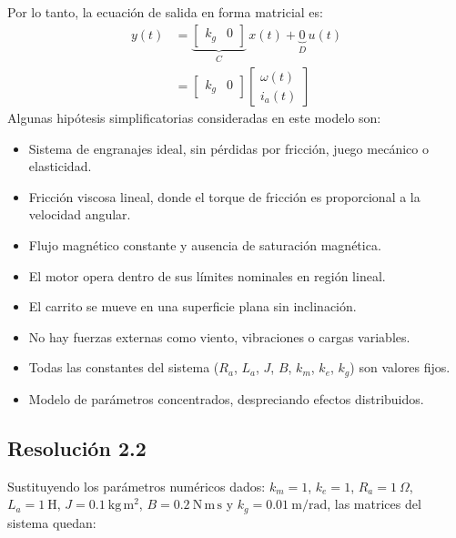 \documentclass[
  11pt,
  letterpaper,
   addpoints,
  answers
  ]{exam}
\begin{document}
\begin{solution}
Por lo tanto, la ecuación de salida en forma matricial es:
\begin{align}
  y(t) &= \underbrace{\begin{bmatrix}k_g & 0\end{bmatrix}}_{C}\,x(t) + \underbrace{0}_{D}\,u(t) \\
  &= \begin{bmatrix} k_g & 0 \end{bmatrix} \begin{bmatrix} \omega(t)\\ i_a(t) \end{bmatrix}
\end{align}
Algunas hipótesis simplificatorias consideradas en este modelo son:
\begin{itemize}
  \item Sistema de engranajes ideal, sin pérdidas por fricción, juego mecánico o elasticidad.
  \item Fricción viscosa lineal, donde el torque de fricción es proporcional a la velocidad angular.
  \item Flujo magnético constante y ausencia de saturación magnética.
  \item El motor opera dentro de sus límites nominales en región lineal.
  \item El carrito se mueve en una superficie plana sin inclinación.
  \item No hay fuerzas externas como viento, vibraciones o cargas variables.
  \item Todas las constantes del sistema ($R_a$, $L_a$, $J$, $B$, $k_m$, $k_e$, $k_g$) son valores fijos.
  \item Modelo de parámetros concentrados, despreciando efectos distribuidos.
\end{itemize}
\subsection*{Resolución 2.2}

Sustituyendo los parámetros numéricos dados: $k_m=1$, $k_e=1$, $R_a=1~\Omega$, $L_a=1~\mathrm{H}$, $J=0.1~\mathrm{kg\,m^2}$, $B=0.2~\mathrm{N\,m\,s}$ y $k_g=0.01~\mathrm{m/rad}$, las matrices del sistema quedan:


\end{solution}
\end{document}
